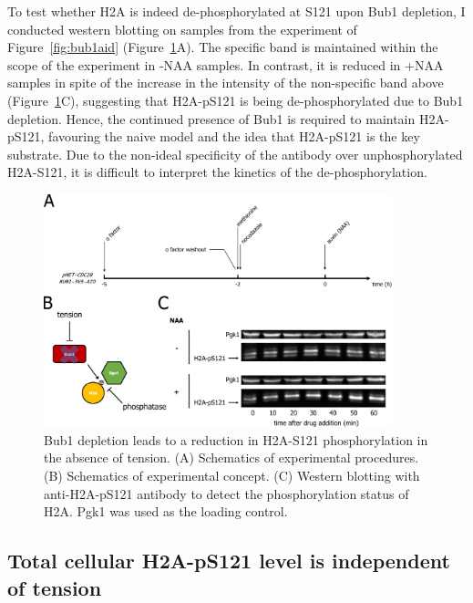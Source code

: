 To test whether H2A is indeed de-phosphorylated at S121 upon Bub1 depletion, I conducted western blotting on samples from the experiment of Figure~\ref{fig:bub1aid} (Figure~\ref{fig:ph2abub1aid}A). The specific band is maintained within the scope of the experiment in -NAA samples. In contrast, it is reduced in +NAA samples in spite of the increase in the intensity of the non-specific band above (Figure~\ref{fig:ph2abub1aid}C), suggesting that H2A-pS121 is being de-phosphorylated due to Bub1 depletion. Hence, the continued presence of Bub1 is required to maintain H2A-pS121, favouring the naive model and the idea that H2A-pS121 is the key substrate. Due to the non-ideal specificity of the antibody over unphosphorylated H2A-S121, it is difficult to interpret the kinetics of the de-phosphorylation. 

\begin{figure}[htbp]
  \centering
  \includegraphics[width=0.9\textwidth]{chapter3/figures/pH2A Bub1-AID.pdf}
  \caption[Bub1 depletion leads to a reduction in H2A-S121 phosphorylation in the absence of tension]{Bub1 depletion leads to a reduction in H2A-S121 phosphorylation in the absence of tension. (A) Schematics of experimental procedures. (B) Schematics of experimental concept. (C) Western blotting with anti-H2A-pS121 antibody to detect the phosphorylation status of H2A. Pgk1 was used as the loading control.}
  \label{fig:ph2abub1aid}
\end{figure} 

\subsection{Total cellular H2A-pS121 level is independent of tension}

